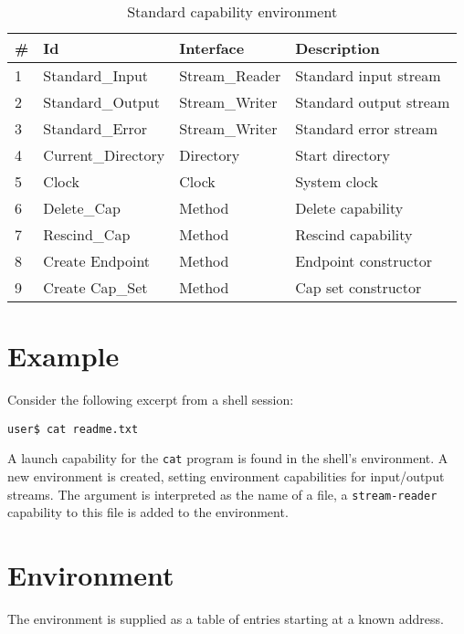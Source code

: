 \begin{table}[ht]
\begin{tabular}{l l l l}
\hline\hline
\# & Id & Interface & Description \\
\hline
1 & Standard\_Input & Stream\_Reader & Standard input stream \\
2 & Standard\_Output & Stream\_Writer & Standard output stream \\
3 & Standard\_Error & Stream\_Writer & Standard error stream \\
4 & Current\_Directory & Directory & Start directory \\
5 & Clock & Clock & System clock \\
6 & Delete\_Cap & Method & Delete capability \\
7 & Rescind\_Cap & Method & Rescind capability \\
8 & Create Endpoint & Method & Endpoint constructor \\
9 & Create Cap\_Set & Method & Cap set constructor \\
\hline
\end{tabular}
\caption{Standard capability environment}
\label{table:standard-cap-env}
\end{table}

\section{Example}

Consider the following excerpt from a shell session:

{\tt user\$ cat readme.txt }

A launch capability for the {\tt cat} program is found in the shell's environment.  A new environment is created, setting environment capabilities for input/output streams.  The argument is interpreted as the name of a file, a {\tt stream-reader} capability to this file is added to the environment.

\section{Environment}

The environment is supplied as a table of entries starting at a known address.

